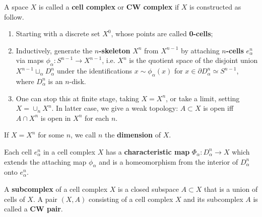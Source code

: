 \begin{defn} A space $X$ is called a \textbf{cell complex} or \textbf{CW complex} if $X$ is constructed as follow.
\begin{enumerate}
\item Starting with a discrete set $X^0$, whose points are called \textbf{0-cells};
\item Inductively, generate the \textbf{$n$-skeleton} $X^n$ from $X^{n-1}$ by attaching \textbf{$n$-cells} $e_\alpha^n$ via maps $\phi_\alpha :S^{n-1}\rightarrow X^{n-1}$, i.e. $X^n$ is the quotient space of the disjoint union $X^{n-1}\sqcup_{\alpha}D_\alpha^n$ under the identifications $x\sim \phi_\alpha(x)$ for $x\in\partial D_\alpha^n\simeq S^{n-1}$, where $D_\alpha^n$ is an $n$-disk.
\item One can stop this at finite stage, taking $X=X^n$, or take a limit, setting $X=\cup_n X^n$. In latter case, we give a weak topology: $A\subset X$ is open iff $A\cap X^n$ is open in $X^n$ for each $n$.
\end{enumerate}

If $X=X^n$ for some $n$, we call $n$ the \textbf{dimension} of $X$.

Each cell $e_\alpha^n$ in a cell complex $X$ has a \textbf{characteristic map} $\Phi_\alpha:D_\alpha^n\rightarrow X$ which extends the attaching map $\phi_\alpha$ and is a homeomorphism from the interior of $D_\alpha^n$ onto $e_\alpha^n.$

A \textbf{subcomplex} of a cell complex $X$ is a closed subspace $A\subset X$ that is a union of cells of $X$. A pair $(X,A)$ consisting of a cell complex $X$ and its subcomplex $A$ is called a \textbf{CW pair}.
\end{defn}

